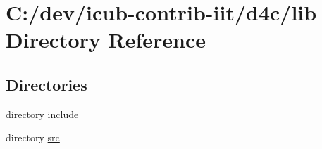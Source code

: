 \section{C\+:/dev/icub-\/contrib-\/iit/d4c/lib Directory Reference}
\label{dir_97aefd0d527b934f1d99a682da8fe6a9}
\subsection*{Directories}
\begin{DoxyCompactItemize}
\item 
directory \hyperlink{dir_5a30104352ef4255dc24354b02eb2d20}{include}
\item 
directory \hyperlink{dir_a065c5f60305fee3569f887679366939}{src}
\end{DoxyCompactItemize}
